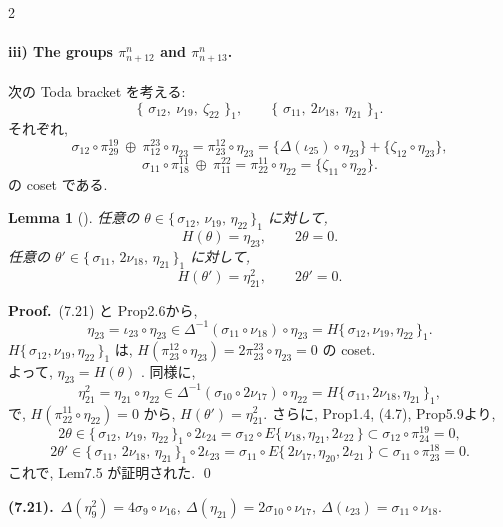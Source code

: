 \documentclass[10pt, leqno]{ltjsarticle}
\newcommand{\toda}[1]{\{\,#1\,\}}              %
\newcommand{\todai}[2][]{\{\,#2\,\}_{#1}}      %
\newcommand{\gen}[1]{\{#1\}}       %
\newcommand{\pit}[2]{\pi_{#1}^{#2}}
\numberwithin{equation}{section}
\theoremstyle{plain}
\newtheorem{lemma}[theorem]{Lemma}
\theoremstyle{definition}
\theoremstyle{remark}
\begin{document}
\begin{paracol}{2}

\paragraph{iii) The groups \(\pit{n+12}{n}\) and \(\pit{n+13}{n}\).}

次の Toda bracket を考える:
\[
  \todai[1]{\,\sigma_{12},\ \nu_{19},\ \zeta_{22}\,},\qquad
  \todai[1]{\,\sigma_{11},\ 2\nu_{18},\ \eta_{21}\,}.
\]
それぞれ,
\[
  \sigma_{12}\circ \pit{29}{19}\ \oplus\ \pit{12}{23}\circ\eta_{23}
  = \pit{23}{12}\circ\eta_{23} 
  = \gen{\Delta(\iota_{25})\circ\eta_{23}} + \gen{\zeta_{12}\circ\eta_{23}},
\]
\[
  \sigma_{11}\circ \pit{18}{11}\ \oplus\ \pit{11}{22}
  = \pit{22}{11}\circ\eta_{22}
  = \gen{\zeta_{11}\circ\eta_{22}} .
\]
の coset である.


\begin{lemma}[]
任意の \(\theta\in\todai[1]{\sigma_{12},\,\nu_{19},\,\eta_{22}}\) に対して,
\[
  H(\theta)=\eta_{23},\qquad 2\theta=0.
\]
任意の \(\theta'\in\todai[1]{\sigma_{11},\,2\nu_{18},\,\eta_{21}}\) に対して,
\[
  H(\theta')=\eta_{21}^{2},\qquad 2\theta'=0.
\]
\end{lemma}

\noindent
\textbf{Proof.}\
(7.21) と Prop2.6から,
\[
\eta_{23}=\iota_{23}\circ\eta_{23}
\in \Delta^{-1}(\sigma_{11}\circ\nu_{18})\circ\eta_{23}
= H\todai[1]{\sigma_{12},\nu_{19},\eta_{22}}.
\]
\(H\todai[1]{\sigma_{12}, \nu_{19}, \eta_{22}}\) は,
\(H(\pit{23}{12}\circ\eta_{23}) = 2\pit{23}{23}\circ\eta_{23} = 0\)
の coset.\\
よって, \(\eta_{23} = H(\theta)\) .
同様に,
\[
\eta_{21}^{2} = \eta_{21}\circ\eta_{22} 
\in\Delta^{-1}(\sigma_{10}\circ2\nu_{17})\circ\eta_{22}
=H\todai[1]{\sigma_{11}, 2\nu_{18}, \eta_{21}},
\] 
で,
\(H(\pit{22}{11}\circ\eta_{22}) = 0\) から, 
\(H(\theta')=\eta_{21}^{2}\). 
さらに, Prop1.4, (4.7),  Prop5.9より,
\[
  2\theta\in\todai[1]{\sigma_{12},\,\nu_{19},\,\eta_{22}}\circ 2\iota_{24}
  = \sigma_{12}\circ E\toda{\nu_{18}, \eta_{21}, 2\iota_{22}}
  \subset \sigma_{12}\circ \pit{24}{19}=0,
\]
\[
2\theta'\in\todai[1]{\sigma_{11},\,2\nu_{18},\,\eta_{21}}\circ2\iota_{23}
= \sigma_{11}\circ E\toda{2\nu_{17}, \eta_{20}, 2\iota_{21}}
\subset \sigma_{11}\circ \pit{23}{18}=0. 
\]
これで, Lem7.5 が証明された. 
\qed

\switchcolumn

\noindent
\textbf{(7.21).}\
\(\Delta(\eta_{9}^{2})=4\sigma_{9}\circ\nu_{16},\
\Delta(\eta_{21})=2\sigma_{10}\circ\nu_{17},\
\Delta(\iota_{23})=\sigma_{11}\circ\nu_{18}.\)


\end{paracol}
\end{document}
